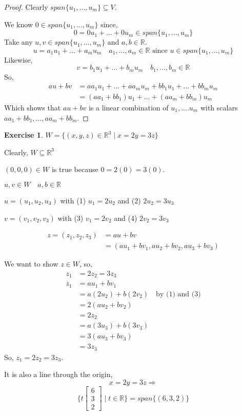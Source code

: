 \documentclass{report}
\theoremstyle{definition}
\newtheorem{_exc}{Exercise}[section]
\theoremstyle{remark}
\begin{document}
\begin{proof}
Clearly $span\{u_1,...,u_m\}\subseteq V$.

We know $0\in span\{u_1,...,u_m\}$ since,
\[0=0u_1+...+0u_m\in span\{u_1,...,u_m\}\]
Take any $u,v\in span\{u_1,...,u_m\}$ and $a,b\in \mathbb{R}$.
\[u=a_1u_1+...+a_mu_m \quad a_1,...,a_m\in\mathbb{R}\text{ since } u\in span\{u_1,...,u_m\}\]
Likewise,
\[v=b_1u_1+...+b_mu_m \quad b_1,...,b_m\in\mathbb{R}\]
So,
\begin{align*}
au+bv&=aa_1u_1+...+aa_mu_m+bb_1u_1+...+bb_mu_m \\
&=(aa_1+bb_1)u_1+...+(aa_m+bb_m)u_m
\end{align*}
Which shows that $au+bv$ is a linear combination of $u_1,....u_m$ with scalars $aa_1+bb_1,...,aa_m+bb_m$.
\end{proof}

\begin{_exc}
$W=\{(x,y,z)\in \mathbb{R}^3\mid x=2y=3z\}$

Clearly, $W\subseteq \mathbb{R}^3$

$(0,0,0)\in W$ is true because $0=2(0)=3(0)$.

$u,v\in W\quad a,b\in \mathbb{R}$

$u=(u_1,u_2,u_3)$ with (1) $u_1=2u_2$ and (2) $2u_2=3u_3$

$v=(v_1,v_2,v_3)$ with (3) $v_1=2v_2$ and (4) $2v_2=3v_3$

\begin{align*}
z=(z_1,z_2,z_3)&=au+bv \\
&=(au_1+bv_1,au_2+bv_2,au_3+bv_3)
\end{align*}

We want to show $z\in W$, so,
\begin{align*}
z_1&=2z_2=3z_3 \\
z_1&=au_1+bv_1 \\
&=a(2u_2)+b(2v_2) \quad \text{by (1) and (3)}\\
&=2(au_2+bv_2) \\
&=2z_2 \\
&=a(3u_3)+b(3v_3) \\
&=3(au_3+bv_3) \\
&=3z_3
\end{align*}
So, $z_1=2z_2=3z_3$.

It is also a line through the origin,
\[x=2y=3z\Rightarrow\]
\[\{t\begin{bmatrix}
6 \\ 3 \\ 2
\end{bmatrix}\mid t\in \mathbb{R}\}=span\{(6,3,2)\}\]
\end{_exc}
\end{document}
